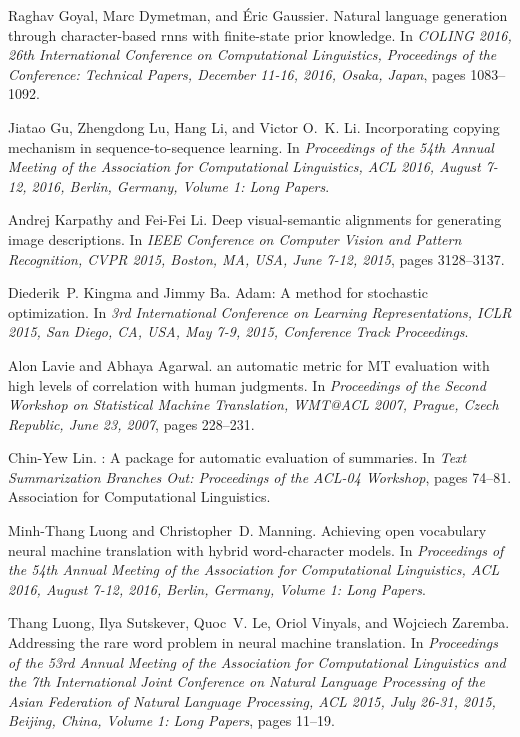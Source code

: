 \documentclass[runningheads, envcountsame, a4paper]{llncs}
\begin{document}
\begin{thebibliography}{10}
Raghav Goyal, Marc Dymetman, and Éric Gaussier.
\newblock Natural language generation through character-based rnns with
  finite-state prior knowledge.
\newblock In {\em {COLING} 2016, 26th International Conference on Computational
  Linguistics, Proceedings of the Conference: Technical Papers, December 11-16,
  2016, Osaka, Japan}, pages 1083--1092.

Jiatao Gu, Zhengdong Lu, Hang Li, and Victor O.~K. Li.
\newblock Incorporating copying mechanism in sequence-to-sequence learning.
\newblock In {\em Proceedings of the 54th Annual Meeting of the Association for
  Computational Linguistics, {ACL} 2016, August 7-12, 2016, Berlin, Germany,
  Volume 1: Long Papers}.

Andrej Karpathy and Fei-Fei Li.
\newblock Deep visual-semantic alignments for generating image descriptions.
\newblock In {\em {IEEE} Conference on Computer Vision and Pattern Recognition,
  {CVPR} 2015, Boston, MA, USA, June 7-12, 2015}, pages 3128--3137.

Diederik~P. Kingma and Jimmy Ba.
\newblock Adam: {A} method for stochastic optimization.
\newblock In {\em 3rd International Conference on Learning Representations,
  {ICLR} 2015, San Diego, CA, USA, May 7-9, 2015, Conference Track
  Proceedings}.

Alon Lavie and Abhaya Agarwal.
 an automatic metric for {MT} evaluation with high levels of
  correlation with human judgments.
\newblock In {\em Proceedings of the Second Workshop on Statistical Machine
  Translation, WMT@ACL 2007, Prague, Czech Republic, June 23, 2007}, pages
  228--231.

Chin-Yew Lin.
: A package for automatic evaluation of summaries.
\newblock In {\em Text Summarization Branches Out: Proceedings of the {ACL}-04
  Workshop}, pages 74--81. Association for Computational Linguistics.

Minh-Thang Luong and Christopher~D. Manning.
\newblock Achieving open vocabulary neural machine translation with hybrid
  word-character models.
\newblock In {\em Proceedings of the 54th Annual Meeting of the Association for
  Computational Linguistics, {ACL} 2016, August 7-12, 2016, Berlin, Germany,
  Volume 1: Long Papers}.

Thang Luong, Ilya Sutskever, Quoc~V. Le, Oriol Vinyals, and Wojciech Zaremba.
\newblock Addressing the rare word problem in neural machine translation.
\newblock In {\em Proceedings of the 53rd Annual Meeting of the Association for
  Computational Linguistics and the 7th International Joint Conference on
  Natural Language Processing of the Asian Federation of Natural Language
  Processing, {ACL} 2015, July 26-31, 2015, Beijing, China, Volume 1: Long
  Papers}, pages 11--19.


\end{thebibliography}
\end{document}
